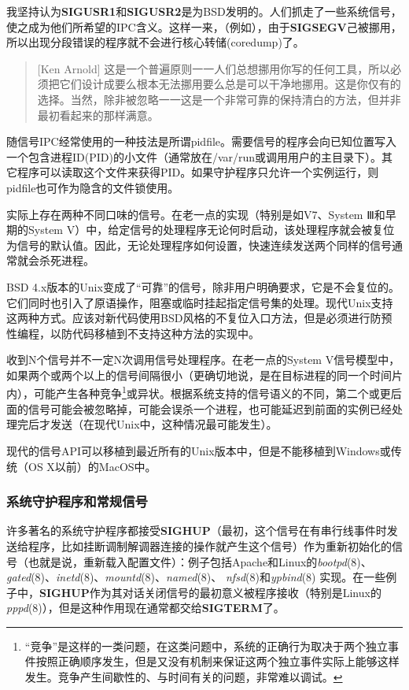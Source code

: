 \documentclass[12pt,oneside]{book}
\begin{document}
我坚持认为\textbf{SIGUSR1}和\textbf{SIGUSR2}是为BSD发明的。人们抓走了一些系统信号，使之成为他们所希望的IPC含义。这样一来，（例如），由于\textbf{SIGSEGV}己被挪用，所以出现分段错误的程序就不会进行核心转储(coredump)了。

\begin{quote}[Ken Arnold]
这是一个普遍原则一一人们总想挪用你写的任何工具，所以必须把它们设计成要么根本无法挪用要么总是可以干净地挪用。这是你仅有的选择。当然，除非被忽略一一这是一个非常可靠的保持清白的方法，但并非最初看起来的那样满意。
\end{quote}

随信号IPC经常使用的一种技法是所谓pidfile。需要信号的程序会向已知位置写入一个包含进程ID(PID)的小文件（通常放在/var/run或调用用户的主目录下）。其它程序可以读取这个文件来获得PID。如果守护程序只允许一个实例运行，则pidfile也可作为隐含的文件锁使用。

实际上存在两种不同口味的信号。在老一点的实现（特别是如V7、System Ⅲ和早期的System V）中，给定信号的处理程序无论何时启动，该处理程序就会被复位为信号的默认值。因此，无论处理程序如何设置，快速连续发送两个同样的信号通常就会杀死进程。

BSD 4.x版本的Unix变成了“可靠”的信号，除非用户明确要求，它是不会复位的。它们同时也引入了原语操作，阻塞或临时挂起指定信号集的处理。现代Unix支持这两种方式。应该对新代码使用BSD风格的不复位入口方法，但是必须进行防预性编程，以防代码移植到不支持这种方法的实现中。

收到N个信号并不一定N次调用信号处理程序。在老一点的System V信号模型中，如果两个或两个以上的信号间隔很小（更确切地说，是在目标进程的同一个时间片内），可能产生各种竞争\footnote{“竞争”是这样的一类问题，在这类问题中，系统的正确行为取决于两个独立事件按照正确顺序发生，但是又没有机制来保证这两个独立事件实际上能够这样发生。竞争产生间歇性的、与时间有关的问题，非常难以调试。}或异状。根据系统支持的信号语义的不同，第二个或更后面的信号可能会被忽略掉，可能会误杀一个进程，也可能延迟到前面的实例已经处理完后才发送（在现代Unix中，这种情况最可能发生）。

现代的信号API可以移植到最近所有的Unix版本中，但是不能移植到Windows或传统（OS X以前）的MacOS中。


\subsubsection{系统守护程序和常规信号}
许多著名的系统守护程序都接受\textbf{SIGHUP}（最初，这个信号在有串行线事件时发送给程序，比如挂断调制解调器连接的操作就产生这个信号）作为重新初始化的信号（也就是说，重新载入配置文件）：例子包括Apache和Linux的\textit{bootpd}(8)、\textit{gated}(8)、\textit{inetd}(8)、\textit{mountd}(8)、\textit{named}(8)、 \textit{nfsd}(8)和\textit{ypbind}(8) 实现。在一些例子中，\textbf{SIGHUP}作为其对话关闭信号的最初意义被程序接收（特别是Linux的\textit{pppd}(8)），但是这种作用现在通常都交给\textbf{SIGTERM}了。
\end{document}
